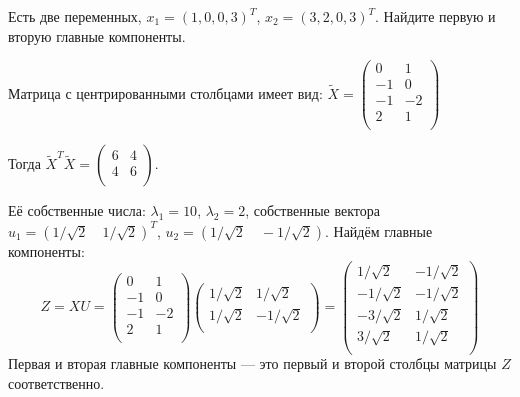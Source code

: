 \documentclass[12pt,fleqn]{article}
\begin{document}
\begin{vkProblem} 
Есть две переменных, $x_1 = (1, 0, 0, 3)^T$, $x_2 = (3, 2, 0, 3)^T$. Найдите первую и вторую главные компоненты.
\end{vkProblem}
\begin{esSolution}
Матрица с центрированными столбцами имеет вид: $\widetilde{X} = \begin{pmatrix}
0 & 1 \\
-1 & 0 \\
-1 & -2 \\
2 & 1 \\
\end{pmatrix}$

Тогда $\widetilde{X}^T\widetilde{X} =
\begin{pmatrix}
6 & 4 \\
4 & 6 \\
\end{pmatrix}$.

Её собственные числа: $\lambda_1 = 10$, $\lambda_2 = 2$, собственные вектора $u_1 = (1/\sqrt{2} \quad 1/\sqrt{2})^T$, $u_2 =  (1/\sqrt{2} \quad -1/\sqrt{2})$.
Найдём главные компоненты:
\[
Z = XU =
\begin{pmatrix}
0 & 1 \\
-1 & 0 \\
-1 & -2 \\
2 & 1 \\
\end{pmatrix}
\begin{pmatrix}
1/\sqrt{2} & 1/\sqrt{2} \\
1/\sqrt{2} & -1/\sqrt{2} \\
\end{pmatrix} =
\begin{pmatrix}
1/\sqrt{2} & -1/\sqrt{2} \\
-1/\sqrt{2} & -1/\sqrt{2} \\
-3/\sqrt{2} & 1/\sqrt{2} \\
3/\sqrt{2} & 1/\sqrt{2}\\
\end{pmatrix}
\]
Первая и вторая главные компоненты — это первый и второй столбцы матрицы $Z$ соответственно.
\end{esSolution}




\end{document}

